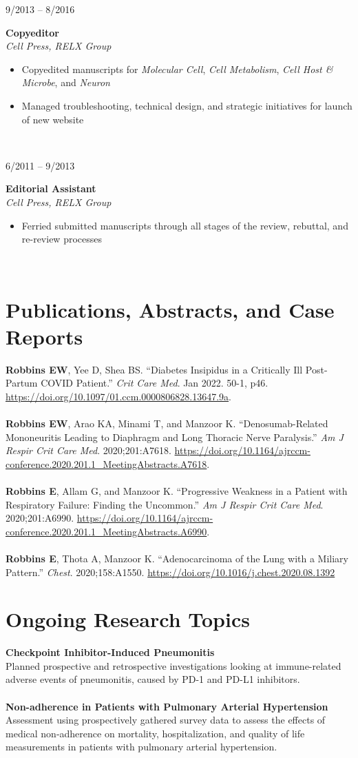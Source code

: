 \documentclass{book}
\newcommand\colleft{.20}
\newcommand\colright{.75}
\newcommand{\entryfour}[4]
	{
		\begin{minipage}[t]{\colleft\textwidth}
		\hfill \textsc{#1}
		\end{minipage}
		\hfill\vline\hfill
		\begin{minipage}[t]{\colright\textwidth}
		{\bf#2}\\
		\textit{#3}
		\footnotesize{#4}
		\end{minipage}\\
		\entryvspace
	}%
\newcommand{\entryvspace}{\vspace{0.5em}}
\begin{document}
		\entryfour{9/2013 -- 8/2016}{Copyeditor}{Cell Press, RELX Group}{%
			\begin{itemize}
				\item Copyedited manuscripts for \emph{Molecular Cell}, \emph{Cell Metabolism}, \emph{Cell Host \& Microbe}, and \emph{Neuron}
				\item Managed troubleshooting, technical design, and strategic initiatives for launch of new website 
			\end{itemize}
		}
		
		\entryfour{6/2011 -- 9/2013}{Editorial Assistant}{Cell Press, RELX Group}{%
			\begin{itemize}
				\item Ferried submitted manuscripts through all stages of the review, rebuttal, and re-review processes
			\end{itemize}
		}
	\section*{Publications, Abstracts, and Case Reports}	
	\textbf{Robbins EW}, Yee D, Shea BS. ``Diabetes Insipidus in a Critically Ill Post-Partum COVID Patient.'' \emph{Crit Care Med}. Jan 2022. 50-1, p46. \url{https://doi.org/10.1097/01.ccm.0000806828.13647.9a}.
	\\ \\
	\textbf{Robbins EW}, Arao KA, Minami T, and Manzoor K. ``Denosumab-Related Mononeuritis Leading to Diaphragm and Long Thoracic Nerve Paralysis.'' \emph{Am J Respir Crit Care Med}. 2020;201:A7618. \url{https://doi.org/10.1164/ajrccm-conference.2020.201.1\_MeetingAbstracts.A7618}.
	\\ \\
	\textbf{Robbins E}, Allam G,  and  Manzoor K. ``Progressive Weakness in a Patient with Respiratory Failure: Finding the Uncommon.'' \emph{Am J Respir Crit Care Med}. 2020;201:A6990. \url{https://doi.org/10.1164/ajrccm-conference.2020.201.1\_MeetingAbstracts.A6990}. 
	\\ \\
	\textbf{Robbins E}, Thota A, Manzoor K. ``Adenocarcinoma of the Lung with a Miliary Pattern.'' \emph{Chest}. 2020;158:A1550. \url{https://doi.org/10.1016/j.chest.2020.08.1392}
  \section*{Ongoing Research Topics}
  \textbf{Checkpoint Inhibitor-Induced Pneumonitis}
  \\
  Planned prospective and retrospective investigations looking at immune-related adverse events of pneumonitis, caused by PD-1 and PD-L1 inhibitors.
	\\ \\
  \textbf{Non-adherence in Patients with Pulmonary Arterial Hypertension}
  \\
	Assessment using prospectively gathered survey data to assess the effects of medical non-adherence on mortality, hospitalization, and quality of life measurements in patients with pulmonary arterial hypertension.
\end{document}
